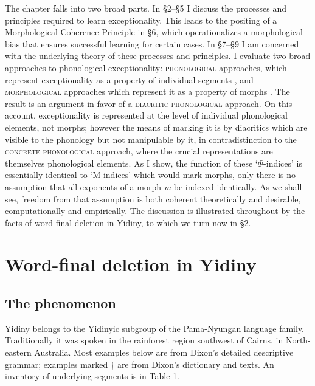 \documentclass[output=paper,
modfonts
]{LSP/langsci}
\begin{document}
The chapter falls into two broad parts. In §2--§5 I discuss the processes and principles required to learn exceptionality. This leads to the positing of a Morphological Coherence Principle in §6, which operationalizes a morphological bias that ensures successful learning for certain cases. In §7--§9 I am concerned with the underlying theory of these processes and principles. I evaluate two broad approaches to phonological exceptionality: \textsc{phonological} approaches, which represent exceptionality as a property of individual segments \citep{bloomfield1939,kiparsky1982c,inkelas1995,zoll1996}, and \textsc{morphological} approaches which represent it as a property of morphs \citep{chomsky1964,chomskyhalle1968,zonneveld1978,pater2000r}. The result is an argument in favor of a \textsc{diacritic} \textsc{phonological} approach. On this account, exceptionality is represented at the level of individual phonological elements, not morphs; however the means of marking it is by diacritics which are visible to the phonology but not manipulable by it, in contradistinction to the \textsc{concrete phonological} approach, where the crucial representations are themselves phonological elements. As I show, the function of these `$\Phi $-indices' is essentially identical to `M-indices' which would mark morphs, only there is no assumption that all exponents of a morph \textit{m} be indexed identically. As we shall see, freedom from that assumption is both coherent theoretically and desirable, computationally and empirically. The discussion is illustrated throughout by the facts of word final deletion in Yidiny, to which we turn now in §2.

\section[Word-final deletion in Yidiny]{Word-final deletion in Yidiny}
\label{bkm:Ref335232760}\subsection{The phenomenon}

Yidiny \citep{dixon1977a} belongs to the Yidinyic subgroup of the Pama-Nyungan language family. Traditionally it was spoken in the rainforest region southwest of Cairns, in North-eastern Australia. Most examples below are from Dixon's \citeyearpar{dixon1977a} detailed descriptive grammar; examples marked † are from Dixon's \citeyearpar{dixon1991} dictionary and texts. An inventory of underlying segments is in Table 1.
\end{document}
